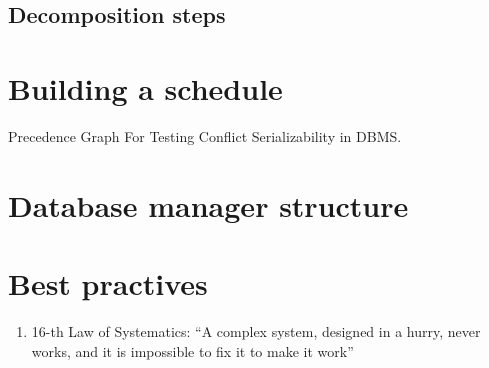 \subsection{Decomposition steps}

\section{Building a schedule}
Precedence Graph For Testing Conflict Serializability in DBMS.

\section{Database manager structure}
%
%

\section{Best practives}

\begin{enumerate}
    \item 16-th Law of Systematics: \enquote{A complex system, designed in a hurry, never works, and it is impossible to fix it to make it work}
\end{enumerate}

